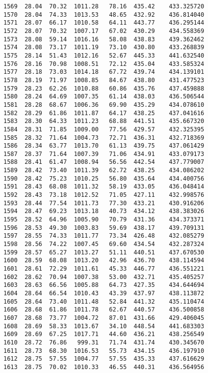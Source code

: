\documentclass[11pt]{article}
\begin{document}
\begin{tcolorbox}[breakable, size=fbox, boxrule=.5pt, pad at break*=1mm, opacityfill=0]
\begin{Verbatim}[commandchars=\\\{\}]
1569  28.04  70.32  1011.28   78.16  435.42    433.325720
1570  28.04  74.33  1013.53   48.65  432.92    436.814040
1571  28.07  66.17  1010.58   64.11  443.77    436.295144
1572  28.07  70.32  1007.17   67.02  430.29    434.558369
1573  28.08  59.14  1016.16   58.08  438.83    439.362462
1574  28.08  73.17  1011.19   73.10  430.80    433.268839
1575  28.14  51.43  1012.16   52.67  445.33    441.632540
1576  28.16  70.98  1008.51   72.12  435.04    433.585324
1577  28.18  73.03  1014.18   67.72  439.74    434.139101
1578  28.19  71.97  1008.85   84.67  438.80    431.477523
1579  28.23  62.26  1010.88   60.86  435.76    437.459888
1580  28.24  64.69  1007.35   61.14  438.03    436.506544
1581  28.28  68.67  1006.36   69.90  435.29    434.078610
1582  28.29  61.86  1011.87   64.17  438.25    437.041616
1583  28.30  64.33  1011.23   68.88  441.51    435.667320
1584  28.31  71.85  1009.00   77.56  429.57    432.325395
1585  28.32  71.64  1004.73   72.71  436.31    432.718369
1586  28.34  63.77  1013.70   61.13  439.75    437.061429
1587  28.37  71.64  1007.39   71.06  434.91    433.079173
1588  28.41  61.47  1008.94   56.56  442.54    437.779007
1589  28.42  73.40  1011.39   62.72  438.25    434.086202
1590  28.42  75.23  1010.25   56.80  435.64    434.400756
1591  28.43  68.08  1011.32   58.19  433.05    436.048414
1592  28.43  73.18  1012.52   71.05  427.11    432.998576
1593  28.44  77.54  1011.73   77.30  433.21    430.916206
1594  28.47  69.23  1013.18   40.73  434.12    438.383026
1595  28.52  64.96  1005.90   70.79  431.36    434.373371
1596  28.53  49.30  1003.83   59.69  438.17    439.709131
1597  28.55  74.33  1011.77   73.34  426.48    432.085279
1598  28.56  74.22  1007.45   69.60  434.54    432.287324
1599  28.57  65.27  1013.27   51.11  440.51    437.670530
1600  28.59  68.08  1013.20   42.96  436.70    438.114594
1601  28.61  72.29  1011.61   45.33  446.77    436.551221
1602  28.62  70.94  1007.38   53.00  432.71    435.405257
1603  28.63  66.56  1005.88   64.73  427.35    434.644694
1604  28.64  66.54  1010.43   43.39  437.97    438.113872
1605  28.64  73.40  1011.48   52.84  441.32    435.110474
1606  28.68  61.86  1011.78   62.67  440.57    436.500858
1607  28.68  73.77  1004.72   87.01  431.66    429.406045
1608  28.69  58.33  1013.67   34.10  448.54    441.683303
1609  28.69  67.25  1017.71   44.60  436.21    438.256549
1610  28.72  76.86   999.31   71.74  431.74    430.345670
1611  28.73  68.30  1016.53   55.73  434.15    436.197910
1612  28.75  57.55  1004.77   57.55  435.33    437.616629
1613  28.75  70.02  1010.33   46.55  440.31    436.564956

\end{Verbatim}
\end{tcolorbox}
\end{document}
